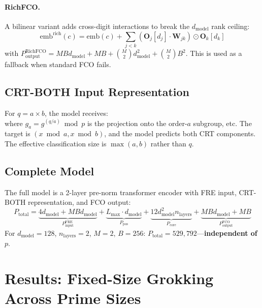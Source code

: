\documentclass[11pt]{article}
\newcommand{\Pcore}{P_{\mathrm{core}}}
\newcommand{\Ptotal}{P_{\mathrm{total}}}
\newcommand{\Pinput}{P_{\mathrm{input}}}
\newcommand{\Poutput}{P_{\mathrm{output}}}
\newcommand{\Ppos}{P_{\mathrm{pos}}}
\newcommand{\dmodel}{d_{\mathrm{model}}}
\newcommand{\nlayers}{n_{\mathrm{layers}}}
\newcommand{\Bbase}{B}
\newcommand{\Mdigits}{M}
\begin{document}
\paragraph{RichFCO.} A bilinear variant adds cross-digit interactions to break the $\dmodel$ rank ceiling:
\begin{equation}
    \mathrm{emb}^{\mathrm{rich}}(c) = \mathrm{emb}(c) + \sum_{j < k} (\mathbf{O}_j[d_j] \cdot \mathbf{W}_{jk}) \odot \mathbf{O}_k[d_k]
\end{equation}
with $\Poutput^{\mathrm{RichFCO}} = M B \dmodel + M B + \binom{M}{2} \dmodel^2 + \binom{M}{2} B^2$. This is used as a fallback when standard FCO fails.

\subsection{CRT-BOTH Input Representation}

For $q = a \times b$, the model receives:
\begin{equation}
    [\mathrm{BOS},\; g_b,\; \mathrm{SEP},\; g_a,\; \mathrm{SEP},\; h_b,\; \mathrm{SEP},\; h_a,\; \mathrm{EOS}]
\end{equation}
where $g_a = g^{(q/a)} \bmod p$ is the projection onto the order-$a$ subgroup, etc. The target is $(x \bmod a, x \bmod b)$, and the model predicts both CRT components. The effective classification size is $\max(a, b)$ rather than $q$.

\subsection{Complete Model}

The full model is a 2-layer pre-norm transformer encoder with FRE input, CRT-BOTH representation, and FCO output:
\begin{equation}
    \Ptotal = \underbrace{4\dmodel + \Mdigits \Bbase \dmodel}_{\Pinput^{\mathrm{FRE}}} + \underbrace{L_{\max} \cdot \dmodel}_{\Ppos} + \underbrace{12 \dmodel^2 \nlayers}_{\Pcore} + \underbrace{\Mdigits \Bbase \dmodel + \Mdigits \Bbase}_{\Poutput^{\mathrm{FCO}}}
\end{equation}
For $\dmodel = 128$, $\nlayers = 2$, $M = 2$, $B = 256$: $\Ptotal = 529{,}792$---\textbf{independent of $p$}.



\section{Results: Fixed-Size Grokking Across Prime Sizes}
\label{sec:results}
\end{document}
